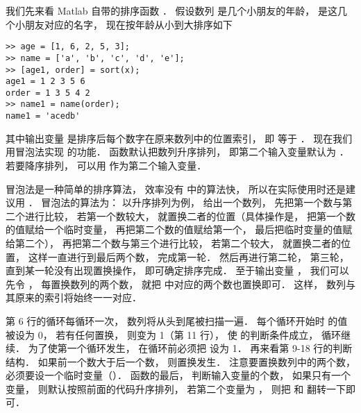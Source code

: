 
我们先来看 Matlab 自带的排序函数 ． 假设数列  是几个小朋友的年龄，  是这几个小朋友对应的名字， 现在按年龄从小到大排序如下
\begin{lstlisting}[language=MatlabCom]
>> age = [1, 6, 2, 5, 3];
>> name = ['a', 'b', 'c', 'd', 'e'];
>> [age1, order] = sort(x);
age1 = 1 2 3 5 6
order = 1 3 5 4 2
>> name1 = name(order);
name1 = 'acedb'
\end{lstlisting}
其中输出变量  是排序后每个数字在原来数列中的位置索引， 即  等于 ． 现在我们用冒泡法实现  的功能．  函数默认把数列升序排列， 即第二个输入变量默认为 ． 若要降序排列， 可以用  作为第二个输入变量．

冒泡法是一种简单的排序算法， 效率没有  中的算法快， 所以在实际使用时还是建议用 ． 冒泡法的算法为： 以升序排列为例， 给出一个数列， 先把第一个数与第二个进行比较， 若第一个数较大， 就置换二者的位置（具体操作是， 把第一个数的值赋给一个临时变量， 再把第二个数的值赋给第一个， 最后把临时变量的值赋给第二个）， 再把第二个数与第三个进行比较， 若第二个较大， 就置换二者的位置， 这样一直进行到最后两个数， 完成第一轮． 然后再进行第二轮， 第三轮， 直到某一轮没有出现置换操作， 即可确定排序完成． 至于输出变量 ， 我们可以先令 ， 每置换数列的两个数， 就把  中对应的两个数也置换即可． 这样， 数列与其原来的索引将始终一一对应． 


第 6 行的循环每循环一次， 数列将从头到尾被扫描一遍． 每个循环开始时  的值被设为 0， 若有任何置换，  则变为 1（第 11 行）， 使  的判断条件成立， 循环继续． 为了使第一个循环发生， 在循环前必须把  设为 1． 再来看第 9-18 行的判断结构． 如果前一个数大于后一个数， 则置换发生． 注意要置换数列中的两个数， 必须要设一个临时变量（）． 函数的最后， 判断输入变量的个数， 如果只有一个变量， 则默认按照前面的代码升序排列， 若第二个变量为 ， 则把  和  翻转一下即可．